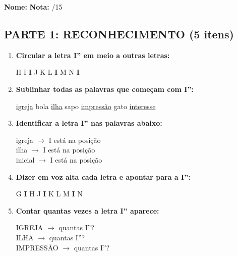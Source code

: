 \begin{exercicio}

\noindent\textbf{Nome:} \underline{\hspace{4cm}} \quad \textbf{Nota:} \underline{\hspace{1cm}}/15

\subsection*{PARTE 1: RECONHECIMENTO (5 itens)}

\begin{enumerate}
  \item \textbf{Circular a letra I'' em meio a outras letras:}
  \begin{center}
  H \quad I \quad \textbf{I} \quad J \quad K \quad L \quad \textbf{I} \quad M \quad N \quad \textbf{I}
  \end{center}

  \item \textbf{Sublinhar todas as palavras que começam com I'':}
  \begin{center}
  \uline{igreja} \quad bola \quad \uline{ilha} \quad sapo \quad \uline{impressão} \quad gato \quad \uline{interesse}
  \end{center}

  \item \textbf{Identificar a letra I'' nas palavras abaixo:}
  \begin{center}
  igreja $\rightarrow$ I está na posição \underline{\hspace{1cm}} \\
  ilha $\rightarrow$ I está na posição \underline{\hspace{1cm}} \\
  inicial $\rightarrow$ I está na posição \underline{\hspace{1cm}}
  \end{center}

  \item \textbf{Dizer em voz alta cada letra e apontar para a I'':}
  \begin{center}
  G \quad \textbf{I} \quad H \quad J \quad \textbf{I} \quad K \quad L \quad M \quad \textbf{I} \quad N
  \end{center}

  \item \textbf{Contar quantas vezes a letra I'' aparece:}
  \begin{center}
  IGREJA $\rightarrow$ quantas I''? \underline{\hspace{1cm}} \\
  ILHA $\rightarrow$ quantas I''? \underline{\hspace{1cm}} \\
  IMPRESSÃO $\rightarrow$ quantas I''? \underline{\hspace{1cm}}
  \end{center}
\end{enumerate}


\end{exercicio}
